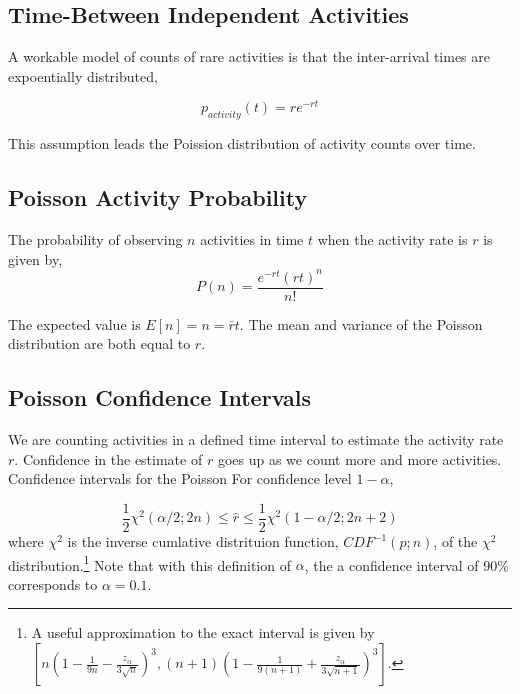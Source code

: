 \documentclass{article}
\begin{document}
\subsection{Time-Between Independent Activities}

A workable model of counts of rare activities is that the inter-arrival times are expoentially distributed, 

\begin{equation}
    \label{eq:tbe}
    p_{activity}(t) = r e^{-r t}
\end{equation}

This assumption leads the Poission distribution of activity counts over time.

\subsection{Poisson Activity Probability}

The probability of observing $n$ activities in time $t$ when the activity rate is $r$ is given by,
\begin{equation}
    \label{eq:poisson}
    P(n) = \frac{e^{-r t} (r t)^n}{n!}
\end{equation}

The expected value is $E[n]=n=\bar{r} t$. The mean and variance of the Poisson distribution are both equal to $r$.

\subsection{Poisson Confidence Intervals}

We are counting activities in a defined time interval to estimate the activity rate $r$.  Confidence in the estimate of $r$ goes up as we count more and more activities. Confidence intervals for the Poisson For confidence level $1-\alpha$,

\begin{equation}
    \label{eq:chisqconf}
    \frac{1}{2} \chi^2(\alpha/2;2n) \leq \hat{r} \leq \frac{1}{2} \chi^2(1-\alpha/2;2n+2)
\end{equation}
where $\chi^2$ is the inverse cumlative distrituion function, $CDF^{-1}(p; n)$, of the $\chi^2$ distribution.\footnote{A useful approximation to the exact interval is given by  $[ n(1 - \frac{1}{9n} - \frac{z_{\alpha}}{3\sqrt{n}})^3 , (n+1)(1- \frac{1}{9(n+1)} + \frac{z_{\alpha}}{3\sqrt{n+1}})^3]$. }
Note that with this definition of $\alpha$, the a confidence interval of 90\% corresponds to $\alpha=0.1$.
\end{document}
